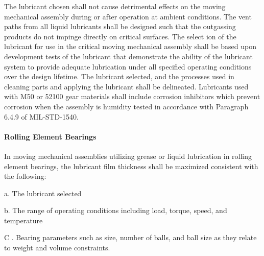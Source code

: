 \documentclass[12pt]{article}
\begin{document}
The lubricant chosen shall not cause detrimental effects on the moving mechanical assembly during or after operation at ambient conditions. 
The vent paths from all liquid lubricants shall be designed such that the outgassing products do not impinge directly on critical surfaces. 
The select ion of the lubricant for use in the critical moving mechanical assembly shall be based upon development tests of the lubricant that demonstrate the ability of the lubricant system to provide adequate lubrication under all specified operating conditions over the design lifetime. 
The lubricant selected, and the processes used in cleaning parts and applying the lubricant shall be delineated. 
Lubricants used with M50 or 52100 gear materials shall include corrosion inhibitors which prevent corrosion when the assembly is humidity tested in accordance with Paragraph 6.4.9 of MIL-STD-1540.

\paragraph{Rolling Element Bearings} %
In moving mechanical assemblies utilizing grease or liquid lubrication in rolling element bearings, the lubricant film thickness shall be maximized consistent with the following:

a. The lubricant selected

b. The range of operating conditions including load, torque, speed, and temperature

C . Bearing parameters such as size, number of balls, and ball size as they relate to weight and volume constraints.
\end{document}
